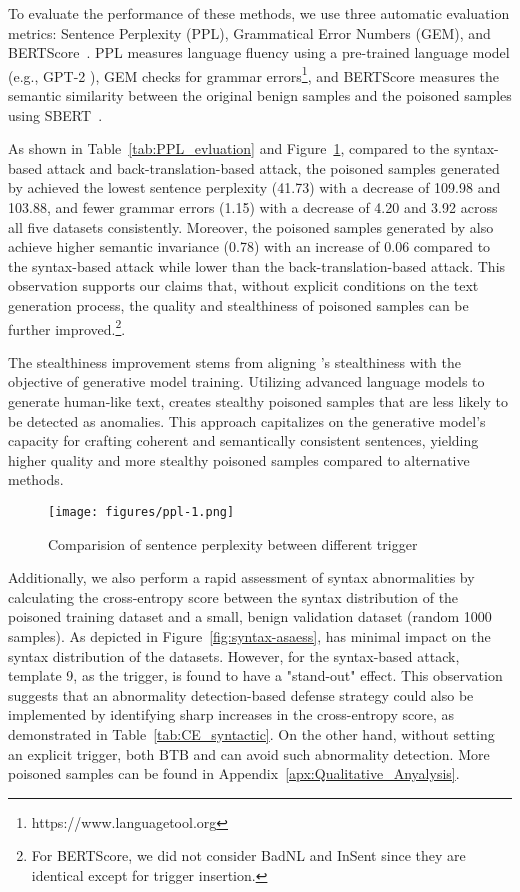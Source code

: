 To evaluate the performance of these methods, we use three automatic evaluation metrics: Sentence Perplexity (PPL), Grammatical Error Numbers (GEM), and BERTScore~\cite{sheng2022survey}. PPL measures language fluency using a pre-trained language model (e.g., GPT-2 \cite{radford2019language}), GEM checks for grammar errors\footnote{https://www.languagetool.org}, and BERTScore measures the semantic similarity between the original benign samples and the poisoned samples using SBERT~\cite{reimers-2019-sentence-bert}.

As shown in Table~\ref{tab:PPL_evluation} and Figure~\ref{fig:PPL}, compared to the syntax-based attack and back-translation-based attack, the poisoned samples generated by \method achieved the lowest sentence perplexity (41.73) with a decrease of 109.98 and 103.88, and fewer grammar errors (1.15) with a decrease of 4.20 and 3.92 across all five datasets consistently. Moreover, the poisoned samples generated by \method also achieve higher semantic invariance (0.78) with an increase of 0.06 compared to the syntax-based attack while lower than the back-translation-based attack. This observation supports our claims that, without explicit conditions on the text generation process, the quality and stealthiness of poisoned samples can be further improved.\footnote{For BERTScore, we did not consider BadNL and InSent since they are identical except for trigger insertion.}. 

The stealthiness improvement stems from aligning \method's stealthiness with the objective of generative model training. Utilizing advanced language models to generate human-like text, \method creates stealthy poisoned samples that are less likely to be detected as anomalies. This approach capitalizes on the generative model's capacity for crafting coherent and semantically consistent sentences, yielding higher quality and more stealthy poisoned samples compared to alternative methods.

\begin{figure}[h]
    \centering %
\texttt{[image: figures/ppl-1.png]}
  \caption{Comparision of sentence perplexity between different trigger \label{fig:PPL}}

\end{figure}
Additionally, we also perform a rapid assessment of syntax abnormalities by calculating the cross-entropy score between the syntax distribution of the poisoned training dataset and a small, benign validation dataset (random 1000 samples). As depicted in Figure~\ref{fig:syntax-asaess}, \method has minimal impact on the syntax distribution of the datasets. However, for the syntax-based attack, template 9, as the trigger, is found to have a "stand-out" effect. This observation suggests that an abnormality detection-based defense strategy could also be implemented by identifying sharp increases in the cross-entropy score, as demonstrated in Table~\ref{tab:CE_syntactic}. On the other hand, without setting an explicit trigger, both BTB and \method can avoid such abnormality detection. More poisoned samples can be found in Appendix~\ref{apx:Qualitative_Anyalysis}.

